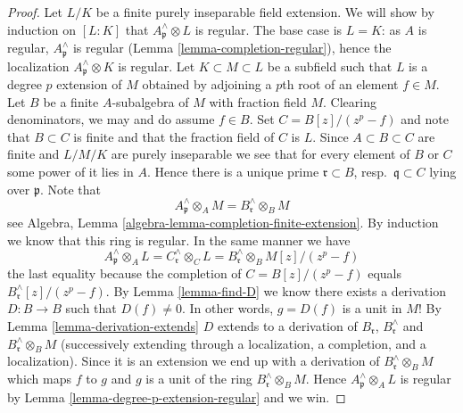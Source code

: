\documentclass[10pt,a4paper]{amsart}
\theoremstyle{plain}
\theoremstyle{definition}
\theoremstyle{remark}
\numberwithin{equation}{subsection}
\begin{document}
\begin{proof}
Let $L/K$ be a finite purely inseparable field extension.
We will show by induction on $[L : K]$ that $A_\mathfrak p^\wedge \otimes L$
is regular. The base case is $L = K$: as $A$ is regular,
$A_\mathfrak p^\wedge$ is regular (Lemma \ref{lemma-completion-regular}),
hence the localization $A_\mathfrak p^\wedge \otimes K$ is regular.
Let $K \subset M \subset L$ be a subfield such that
$L$ is a degree $p$ extension of $M$ obtained by adjoining a $p$th root
of an element $f \in M$. Let $B$ be a finite $A$-subalgebra
of $M$ with fraction field $M$. Clearing denominators, we may and do assume
$f \in B$. Set $C = B[z]/(z^p -f)$ and note that $B \subset C$
is finite and that the fraction field of $C$ is $L$. Since
$A \subset B \subset C$ are finite and $L/M/K$ are purely
inseparable we see that for every element of $B$ or $C$ some power of
it lies in $A$. Hence there is a unique prime $\mathfrak r \subset B$,
resp.\ $\mathfrak q \subset C$ lying over $\mathfrak p$. Note that
$$
A_\mathfrak p^\wedge \otimes_A M = B_\mathfrak r^\wedge \otimes_B M
$$
see Algebra, Lemma \ref{algebra-lemma-completion-finite-extension}.
By induction we know that this ring is regular. In the same manner we have
$$
A_\mathfrak p^\wedge \otimes_A L =
C_\mathfrak r^\wedge \otimes_C L =
B_\mathfrak r^\wedge \otimes_B M[z]/(z^p - f)
$$
the last equality because the completion of
$C = B[z]/(z^p - f)$ equals $B_\mathfrak r^\wedge[z]/(z^p -f)$.
By Lemma \ref{lemma-find-D} we know there exists a derivation
$D : B \to B$ such that $D(f) \not = 0$. In other words, $g = D(f)$
is a unit in $M$! By Lemma \ref{lemma-derivation-extends}
$D$ extends to a derivation of $B_\mathfrak r$, $B_\mathfrak r^\wedge$
and $B_\mathfrak r^\wedge \otimes_B M$ (successively extending through a
localization, a completion, and a localization). Since it is an
extension we end up with a derivation of $B_\mathfrak r^\wedge \otimes_B M$
which maps $f$ to $g$ and $g$ is a unit of the ring
$B_\mathfrak r^\wedge \otimes_B M$.
Hence $A_\mathfrak p^\wedge \otimes_A L$ is regular by
Lemma \ref{lemma-degree-p-extension-regular} and we win.
\end{proof}
\end{document}
